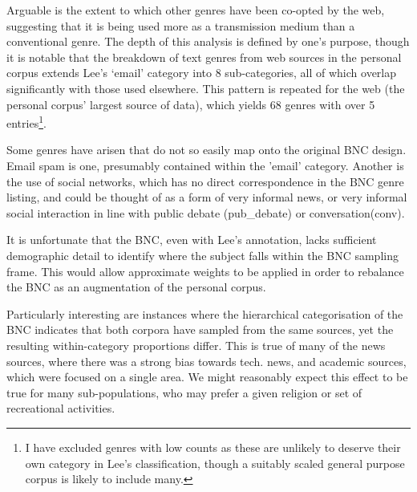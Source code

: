 Arguable is the extent to which other genres have been co-opted by the web, suggesting that it is being used more as a transmission medium than a conventional genre.  The depth of this analysis is defined by one's purpose, though it is notable that the breakdown of text genres from web sources in the personal corpus extends Lee's `email' category into 8 sub-categories, all of which overlap significantly with those used elsewhere.  This pattern is repeated for the web (the personal corpus' largest source of data), which yields 68 genres with over 5 entries\footnote{I have excluded genres with low counts as these are unlikely to deserve their own category in Lee's classification, though a suitably scaled general purpose corpus is likely to include many.}.

Some genres have arisen that do not so easily map onto the original BNC design.  Email spam is one, presumably contained within the 'email' category.  Another is the use of social networks, which has no direct correspondence in the BNC genre listing, and could be thought of as a form of very informal news, or very informal social interaction in line with public debate (pub\_debate) or conversation(conv).









It is unfortunate that the BNC, even with Lee's annotation, lacks sufficient demographic detail to identify where the subject falls within the BNC sampling frame.  This would allow approximate weights to be applied in order to rebalance the BNC as an augmentation of the personal corpus.


Particularly interesting are instances where the hierarchical categorisation of the BNC indicates that both corpora have sampled from the same sources, yet the resulting within-category proportions differ.  This is true of many of the news sources, where there was a strong bias towards tech. news, and academic sources, which were focused on a single area.  We might reasonably expect this effect to be true for many sub-populations, who may prefer a given religion or set of recreational activities.  


